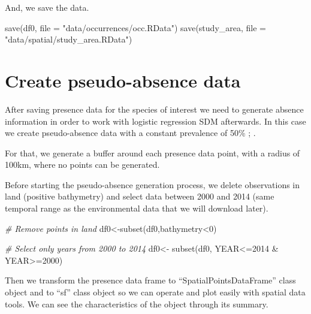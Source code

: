\documentclass[
]{book}
\newenvironment{Shaded}{\begin{snugshade}}{\end{snugshade}}
\newcommand{\AttributeTok}[1]{\textcolor[rgb]{0.77,0.63,0.00}{#1}}
\newcommand{\CommentTok}[1]{\textcolor[rgb]{0.56,0.35,0.01}{\textit{#1}}}
\newcommand{\DecValTok}[1]{\textcolor[rgb]{0.00,0.00,0.81}{#1}}
\newcommand{\FunctionTok}[1]{\textcolor[rgb]{0.00,0.00,0.00}{#1}}
\newcommand{\NormalTok}[1]{#1}
\newcommand{\OtherTok}[1]{\textcolor[rgb]{0.56,0.35,0.01}{#1}}
\newcommand{\SpecialCharTok}[1]{\textcolor[rgb]{0.00,0.00,0.00}{#1}}
\newcommand{\StringTok}[1]{\textcolor[rgb]{0.31,0.60,0.02}{#1}}
\begin{document}
And, we save the data.

\begin{Shaded}
\begin{Highlighting}[]
\FunctionTok{save}\NormalTok{(df0, }\AttributeTok{file =} \StringTok{"data/occurrences/occ.RData"}\NormalTok{)}
\FunctionTok{save}\NormalTok{(study\_area, }\AttributeTok{file =} \StringTok{"data/spatial/study\_area.RData"}\NormalTok{)}
\end{Highlighting}
\end{Shaded}

\hypertarget{create-pseudo-absence-data}{%
\section{Create pseudo-absence data}\label{create-pseudo-absence-data}}

After saving presence data for the species of interest we need to generate absence information in order to work with logistic regression SDM afterwards. In this case we create pseudo-absence data with a constant prevalence of 50\% \citep{mcpherson_2004}; \citep{barbetmassin_etal_2012}.

For that, we generate a buffer around each presence data point, with a radius of 100km, where no points can be generated.

Before starting the pseudo-absence generation process, we delete observations in land (positive bathymetry) and select data between 2000 and 2014 (same temporal range as the environmental data that we will download later).

\begin{Shaded}
\begin{Highlighting}[]
\CommentTok{\# Remove points in land}
\NormalTok{df0}\OtherTok{\textless{}{-}}\FunctionTok{subset}\NormalTok{(df0,bathymetry}\SpecialCharTok{\textless{}}\DecValTok{0}\NormalTok{)}

\CommentTok{\# Select only years from 2000 to 2014}
\NormalTok{df0}\OtherTok{\textless{}{-}} \FunctionTok{subset}\NormalTok{(df0, YEAR}\SpecialCharTok{\textless{}=}\DecValTok{2014} \SpecialCharTok{\&}\NormalTok{ YEAR}\SpecialCharTok{\textgreater{}=}\DecValTok{2000}\NormalTok{)}
\end{Highlighting}
\end{Shaded}

Then we transform the presence data frame to ``SpatialPointsDataFrame'' class object and to ``sf'' class object so we can operate and plot easily with spatial data tools. We can see the characteristics of the object through its summary.
\end{document}
